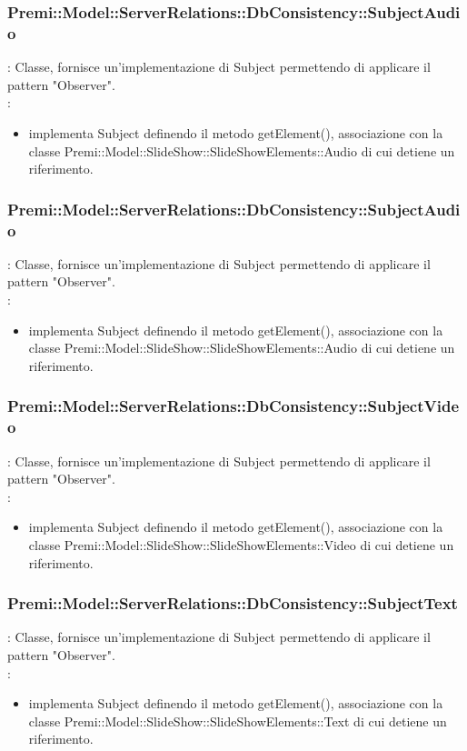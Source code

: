 {             \subsubsection{Premi::Model::ServerRelations::DbConsistency::SubjectAudio}{
				\textbf{\tipo}: Classe, fornisce un’implementazione di Subject permettendo di applicare il pattern "Observer".\\	
				\textbf{\relaz}: 
				\begin{itemize}
					\item implementa Subject definendo il metodo getElement(), associazione con la classe Premi::Model::SlideShow::SlideShowElements::Audio di cui detiene un riferimento.
				\end{itemize}	
            }
            
            \subsubsection{Premi::Model::ServerRelations::DbConsistency::SubjectAudio}{
				\textbf{\tipo}: Classe, fornisce un’implementazione di Subject permettendo di applicare il pattern "Observer".\\	
				\textbf{\relaz}: 
				\begin{itemize}
					\item implementa Subject definendo il metodo getElement(), associazione con la classe Premi::Model::SlideShow::SlideShowElements::Audio di cui detiene un riferimento.
				\end{itemize}	
            }
            
            \subsubsection{Premi::Model::ServerRelations::DbConsistency::SubjectVideo}{
				\textbf{\tipo}: Classe, fornisce un’implementazione di Subject permettendo di applicare il pattern "Observer".\\	
				\textbf{\relaz}: 
				\begin{itemize}
					\item implementa Subject definendo il metodo getElement(), associazione con la classe Premi::Model::SlideShow::SlideShowElements::Video di cui detiene un riferimento.
				\end{itemize}	
            }
            
            \subsubsection{Premi::Model::ServerRelations::DbConsistency::SubjectText}{
				\textbf{\tipo}: Classe, fornisce un’implementazione di Subject permettendo di applicare il pattern "Observer".\\	
				\textbf{\relaz}: 
				\begin{itemize}
					\item implementa Subject definendo il metodo getElement(), associazione con la classe Premi::Model::SlideShow::SlideShowElements::Text di cui detiene un riferimento.
				\end{itemize}	
            }
            
}
